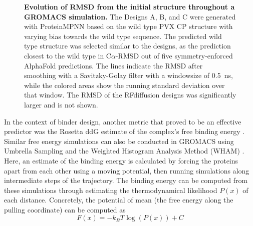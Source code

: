 \begin{figure}
    
    \caption{\textbf{Evolution of RMSD from the initial structure throughout a GROMACS simulation. } The Designs A, B, and C were generated with ProteinMPNN based on the wild type PVX CP structure with varying bias towards the wild type sequence. The predicted wild type structure was selected similar to the designs, as the prediction closest to the wild type in C$\alpha$-RMSD out of five symmetry-enforced AlphaFold predictions. The lines indicate the RMSD after smoothing with a Savitzky-Golay filter with a windowsize of \SI{0.5}{\nano\second}, while the colored areas show the running standard deviation over that window. The RMSD of the RFdiffusion designs was significantly larger and is not shown. }
    \label{fig:gromacs_rmsd_gyrate}
\end{figure}

In the context of binder design, another metric that proved to be an effective predictor was the Rosetta ddG estimate of the complex's free binding energy \cite{physics_binder_design}. Similar free energy simulations can also be conducted in GROMACS using Umbrella Sampling and the Weighted Histogram Analysis Method (WHAM) \cite{wham_method}. Here, an estimate of the binding energy is calculated by forcing the proteins apart from each other using a moving potential, then running simulations along intermediate steps of the trajectory. The binding energy can be computed from these simulations through estimating the thermodynamical likelihood $P(x)$ of each distance. Concretely, the potential of mean (the free energy along the pulling coordinate) can be computed as 
\begin{equation}
    F(x) = -k_B T \log(P(x)) + C
\end{equation}

